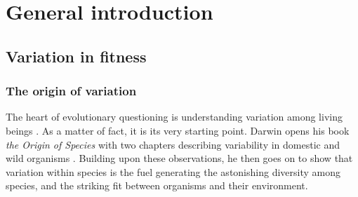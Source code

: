 
\chapter[\texorpdfstring{Chapter 1 \\ General introduction}{Chapter 1 General introduction}]{General introduction}
\label{chap:intro}

\section{Variation in fitness}
\subsection{The origin of variation}
The heart of evolutionary questioning is understanding variation among living beings \parencite{Lynch1998, Wayne2006, Kruuk2014}. As a matter of fact, it is its very starting point. Darwin opens his book \emph{the Origin of Species} with two chapters describing variability in domestic and wild organisms \parencite{Darwin1859}.
Building upon these observations, he then goes on to show that variation within species is the fuel generating the astonishing diversity among species, and the striking fit between organisms and their environment.

